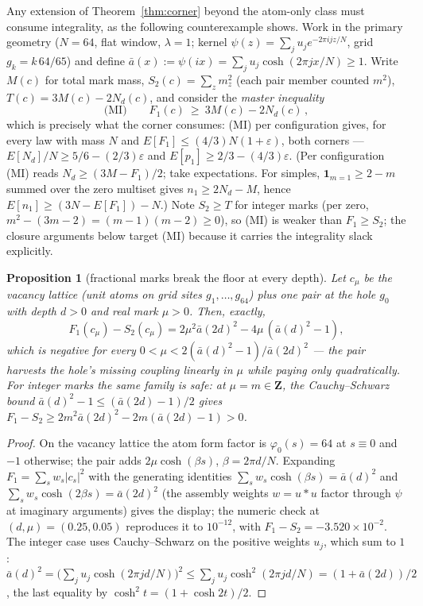 \documentclass[11pt]{article}
\theoremstyle{plain}
\newtheorem{proposition}[theorem]{Proposition}
\theoremstyle{definition}
\theoremstyle{remark}
\newcommand{\Z}{\mathbf{Z}}
\newcommand{\Nd}{N_{d}}
\newcommand{\one}{\mathbf{1}}
\begin{document}
Any extension of Theorem~\ref{thm:corner} beyond the atom-only class must
consume integrality, as the following counterexample shows. Work in the primary
geometry ($N = 64$, flat window, $\lambda = 1$; kernel
$\psi(z) = \sum_j u_j e^{-2\pi i j z/N}$, grid $g_k = k\,64/65$) and define
$\bar{a}(x) := \psi(ix) = \sum_j u_j \cosh(2\pi j x/N) \ge 1$. Write $M(c)$ for
total mark mass, $S_2(c) = \sum_z m_z^2$ (each pair member counted $m^2$),
$T(c) = 3M(c) - 2\Nd(c)$, and consider the \emph{master inequality}
\[
  \text{(MI)} \qquad F_1(c) \ \ge\ 3M(c) - 2\Nd(c) \,,
\]
which is precisely what the corner consumes: (MI) per configuration gives, for
every law with mass $N$ and $E[F_1] \le (4/3)N(1 + \varepsilon)$, both corners ---
$E[\Nd]/N \ge 5/6 - (2/3)\varepsilon$ and
$E[p_1] \ge 2/3 - (4/3)\varepsilon$. (Per configuration (MI) reads
$\Nd \ge (3M - F_1)/2$; take expectations. For simples,
$\one_{m = 1} \ge 2 - m$ summed over the zero multiset gives
$n_1 \ge 2\Nd - M$, hence $E[n_1] \ge (3N - E[F_1]) - N$.) Note $S_2 \ge T$ for
integer marks (per zero, $m^2 - (3m - 2) = (m-1)(m-2) \ge 0$), so (MI) is weaker
than $F_1 \ge S_2$; the closure arguments below target (MI) because it carries
the integrality slack explicitly.

\begin{proposition}[fractional marks break the floor at every depth]
\label{prop:fractional}
Let $c_\mu$ be the vacancy lattice (unit atoms on grid sites
$g_1, \ldots, g_{64}$) plus one pair at the hole $g_0$ with depth $d > 0$ and
real mark $\mu > 0$. Then, exactly,
\[
  F_1(c_\mu) - S_2(c_\mu)
  = 2\mu^2 \bar{a}(2d)^2 - 4\mu\,(\bar{a}(d)^2 - 1),
\]
which is negative for every $0 < \mu < 2(\bar{a}(d)^2 - 1)/\bar{a}(2d)^2$ --- the
pair harvests the hole's missing coupling linearly in $\mu$ while paying only
quadratically. For integer marks the same family is safe: at $\mu = m \in \Z$,
the Cauchy--Schwarz bound $\bar{a}(d)^2 - 1 \le (\bar{a}(2d) - 1)/2$ gives
$F_1 - S_2 \ge 2m^2 \bar{a}(2d)^2 - 2m(\bar{a}(2d) - 1) > 0$.
\end{proposition}

\begin{proof}
On the vacancy lattice the atom form factor is $\varphi_0(s) = 64$ at
$s \equiv 0$ and $-1$ otherwise; the pair adds $2\mu \cosh(\beta s)$,
$\beta = 2\pi d/N$. Expanding $F_1 = \sum_s w_s |c_s|^2$ with the generating
identities $\sum_s w_s \cosh(\beta s) = \bar{a}(d)^2$ and
$\sum_s w_s \cosh(2\beta s) = \bar{a}(2d)^2$ (the assembly weights $w = u * u$
factor through $\psi$ at imaginary arguments) gives the display; the numeric
check at $(d, \mu) = (0.25, 0.05)$ reproduces it to $10^{-12}$, with
$F_1 - S_2 = -3.520 \times 10^{-2}$. The integer case uses Cauchy--Schwarz on the
positive weights $u_j$, which sum to $1$:
$\bar{a}(d)^2 = \bigl(\sum_j u_j \cosh(2\pi j d/N)\bigr)^2
 \le \sum_j u_j \cosh^2(2\pi j d/N) = (1 + \bar{a}(2d))/2$, the last equality
by $\cosh^2 t = (1 + \cosh 2t)/2$.
\end{proof}
\end{document}
